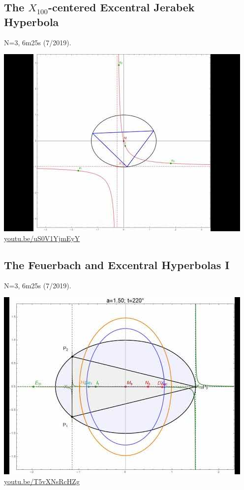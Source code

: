 \documentclass[12pt]{amsart}
\begin{document}
\subsection{The $X_{100}$-centered Excentral Jerabek Hyperbola}
\label{vid:uS0V1YjmEyY}
\noindent N=3, 6m25s (7/2019). 
\begin{center}\includegraphics[width=.5\textwidth]{pics/uS0V1YjmEyY.jpg} \\ 
\href{https://youtu.be/uS0V1YjmEyY}{\url{youtu.be/uS0V1YjmEyY}}\end{center}
% 

\subsection{The Feuerbach and Excentral Hyperbolas I}
\label{vid:T5vXNsRcHZg}
\noindent N=3, 6m25s (7/2019). 
\begin{center}\includegraphics[width=.5\textwidth]{pics/T5vXNsRcHZg.jpg} \\ 
\href{https://youtu.be/T5vXNsRcHZg}{\url{youtu.be/T5vXNsRcHZg}}\end{center}
% 
\end{document}
